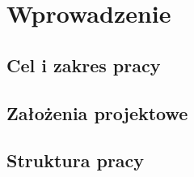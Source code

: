 \chapter{Wprowadzenie}
\label{chap: Wprowadzenie}


\section{Cel i zakres pracy}
\label{sec: Cel i zakres pracy}

\section{Założenia projektowe}
\label{sec: Założenia projektowe}

\section{Struktura pracy}
\label{sec: Struktura pracy}